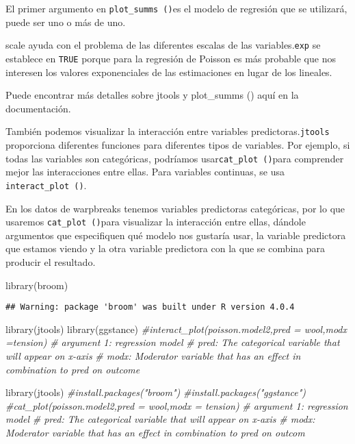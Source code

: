 \documentclass[
]{book}
\newenvironment{Shaded}{\begin{snugshade}}{\end{snugshade}}
\newcommand{\CommentTok}[1]{\textcolor[rgb]{0.56,0.35,0.01}{\textit{#1}}}
\newcommand{\FunctionTok}[1]{\textcolor[rgb]{0.00,0.00,0.00}{#1}}
\newcommand{\NormalTok}[1]{#1}
\begin{document}
El primer argumento en \texttt{plot\_summs\ ()}es el modelo de regresión que se utilizará, puede ser uno o más de uno.

scale ayuda con el problema de las diferentes escalas de las variables.\texttt{exp} se establece en \texttt{TRUE} porque para la regresión de Poisson es más probable que nos interesen los valores exponenciales de las estimaciones en lugar de los lineales.

Puede encontrar más detalles sobre jtools y plot\_summs () aquí en la documentación.

También podemos visualizar la interacción entre variables predictoras.\texttt{jtools} proporciona diferentes funciones para diferentes tipos de variables. Por ejemplo, si todas las variables son categóricas, podríamos usar\texttt{cat\_plot\ ()}para comprender mejor las interacciones entre ellas. Para variables continuas, se usa \texttt{interact\_plot\ ()}.

En los datos de warpbreaks tenemos variables predictoras categóricas, por lo que usaremos \texttt{cat\_plot\ ()}para visualizar la interacción entre ellas, dándole argumentos que especifiquen qué modelo nos gustaría usar, la variable predictora que estamos viendo y la otra variable predictora con la que se combina para producir el resultado.

\begin{Shaded}
\begin{Highlighting}[]
\FunctionTok{library}\NormalTok{(broom)}
\end{Highlighting}
\end{Shaded}

\begin{verbatim}
## Warning: package 'broom' was built under R version 4.0.4
\end{verbatim}

\begin{Shaded}
\begin{Highlighting}[]
\FunctionTok{library}\NormalTok{(jtools)}
\FunctionTok{library}\NormalTok{(ggstance)}
\CommentTok{\#interact\_plot(poisson.model2,pred = wool,modx =tension)}
\CommentTok{\# argument 1: regression model}
\CommentTok{\# pred: The categorical variable that will appear on x{-}axis}
\CommentTok{\# modx: Moderator variable that has an effect in combination to pred on outcome}
\end{Highlighting}
\end{Shaded}

\begin{Shaded}
\begin{Highlighting}[]
\FunctionTok{library}\NormalTok{(jtools)}
\CommentTok{\#install.packages("broom")}
\CommentTok{\#install.packages("ggstance")}
\CommentTok{\#cat\_plot(poisson.model2,pred = wool,modx = tension)}
\CommentTok{\# argument 1: regression model}
\CommentTok{\# pred: The categorical variable that will appear on x{-}axis}
\CommentTok{\# modx: Moderator variable that has an effect in combination to pred on outcom}
\end{Highlighting}
\end{Shaded}
\end{document}
